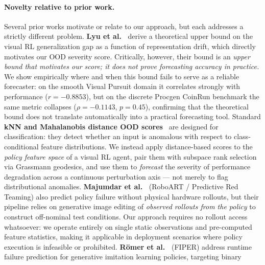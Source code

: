 
\paragraph{Novelty relative to prior work.}
Several prior works motivate or relate to our approach, but each addresses a
strictly different problem.
%
\textbf{Lyu et al.~\cite{lyu2024generalization}} derive a theoretical upper bound on
the visual RL generalization gap as a function of representation drift, which
directly motivates our OOD severity score.
Critically, however, their bound is an \emph{upper bound that motivates our
score; it does not prove forecasting accuracy in practice.}
We show empirically where and when this bound fails to serve as a reliable
forecaster: on the smooth Visual Pursuit domain it correlates strongly with
performance ($r = -0.8853$), but on the discrete Procgen CoinRun benchmark
the same metric collapses ($\rho = -0.1143$, $p = 0.45$), confirming that the
theoretical bound does not translate automatically into a practical forecasting
tool.
%
Standard \textbf{kNN and Mahalanobis distance OOD scores}~\cite{lee2018simple}
are designed for classification: they detect whether an input is anomalous
with respect to class-conditional feature distributions.
We instead apply distance-based scores to the \emph{policy feature space} of a
visual RL agent, pair them with subspace rank selection via Grassmann geodesics,
and use them to \emph{forecast} the severity of performance degradation across
a continuous perturbation axis — not merely to flag distributional anomalies.
%
\textbf{Majumdar et al.~\cite{majumdar2025predictive}} (RoboART / Predictive Red
Teaming) also predict policy failure without physical hardware rollouts, but
their pipeline relies on generative image editing of \emph{observed rollouts
from the policy} to construct off-nominal test conditions.
Our approach requires no rollout access whatsoever: we operate entirely on
single static observations and pre-computed feature statistics, making it
applicable in deployment scenarios where policy execution is infeasible or
prohibited.
%
\textbf{Römer et al.~\cite{romer2025fiper}} (FIPER) address runtime failure
prediction for generative imitation learning policies, targeting binary
